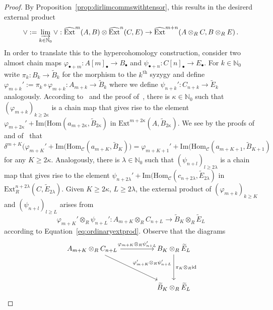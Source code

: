 \documentclass[12pt, a4paper]{article}
\numberwithin{equation}{section}
\theoremstyle{empty}
\theoremstyle{nonumberplain}
\newtheorem{proof}{Proof}
\begin{document}
\begin{proof}
By Proposition~\ref{prop:dirlimcommswithtensor}, this results in the desirerd external product
\[ \vee := \varinjlim_{k \in \mathbb{N}_0} \vee: \widehat{\mathrm{Ext}}^m(A, B) \otimes \widehat{\mathrm{Ext}}^n(C, E) \rightarrow \widehat{\mathrm{Ext}}^{m+n}(A \otimes_R C, B \otimes_R E) \, . \]
In order to translate this to the hypercohomology construction, consider two almost chain maps $\varphi_{\bullet+m}: A[m]_{\bullet} \rightarrow B_{\bullet}$ and $\psi_{\bullet+n}: C[n]_{\bullet} \rightarrow E_{\bullet}$. For $k \in \mathbb{N}_0$ write $\pi_k: B_k \rightarrow \widetilde{B}_k$ for the morphism to the $k^{\text{th}}$ syzygy and define $\varphi_{m+k}' := \pi_k \circ \varphi_{m+k}: A_{m+k} \rightarrow \widetilde{B}_k$ where we define $\psi_{n+k}': C_{n+k} \rightarrow \widetilde{E}_k$ analogously. According to~\cite[Lemma~6.7]{ghe24} and the proof of~\cite[Lemma~6.12]{ghe24}, there is $\kappa \in \mathbb{N}_0$ such that $(\varphi_{m+k})_{k \geq 2{\kappa}}$ is a chain map that gives rise to the element $\varphi_{m+2{\kappa}}'+\mathrm{Im}(\mathrm{Hom}(a_{m+2{\kappa}}, \widetilde{B}_{2{\kappa}})$ in $\mathrm{Ext}^{m+2{\kappa}}(A, \widetilde{B}_{2{\kappa}})$. We see by the proofs of~\cite[Lemma~6.7]{ghe24} and of~\cite[Lemma~6.12]{ghe24} that
\[ \delta^{m+K}\big(\varphi_{m+K}'+\mathrm{Im}(\mathrm{Hom}_{\mathcal{C}}(a_{m+K}, \widetilde{B}_K) \big) = \varphi_{m+K+1}'+\mathrm{Im}(\mathrm{Hom}_{\mathcal{C}}(a_{m+K+1}, \widetilde{B}_{K+1}) \]
for any $K \geq 2{\kappa}$. Analogously, there is $\lambda \in \mathbb{N}_0$ such that $(\psi_{n+l})_{l \geq 2{\lambda}}$  is a chain map that gives rise to the element $\psi_{n+2{\lambda}}'+\mathrm{Im}(\mathrm{Hom}_{\mathcal{C}}(c_{n+2{\lambda}}, \widetilde{E}_{2{\lambda}})$ in $\mathrm{Ext}_R^{n+2{\lambda}}(C, \widetilde{E}_{2{\lambda}})$. Given $K \geq 2{\kappa}$, $L \geq 2{\lambda}$, the external product of $(\varphi_{m+k})_{k \geq K}$ and $(\psi_{n+l})_{l \geq L}$ arises from
\[ \varphi_{m+K}' \otimes_R \psi_{n+L}': A_{m+K} \otimes_R C_{n+L} \rightarrow \widetilde{B}_K \otimes_R \widetilde{E}_L \]
according to Equation~\ref{eq:ordinaryextprod}. Observe that the diagrams
\begin{equation}\label{diag:liftmorphismone}
\begin{tikzcd}
    A_{m+K} \otimes_R C_{n+L} \arrow[rr, "\varphi_{m+K} \otimes_R \psi_{n+L}'"] \arrow[ddrr, "\varphi_{m+K}' \otimes_R \psi_{n+L}'"] & & B_K \otimes_R \widetilde{E}_L \arrow[dd, "\pi_K \otimes_R \mathrm{id}"] \\ \\
    & & \widetilde{B}_K \otimes_R \widetilde{E}_L

\end{tikzcd}
\end{equation}
\end{proof}
\end{document}
